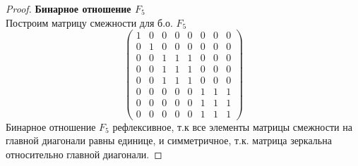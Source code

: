 \pagebreak
\begin{proof} \textbf{Бинарное отношение $F_5$}\\
Построим матрицу смежности для б.о. $F_5$\\
$$ \left( \begin{array}{cccccccc}
          1 &0 &0 &0 &0 &0 &0 &0
        \\0 &1 &0 &0 &0 &0 &0 &0
        \\0 &0 &1 &1 &1 &0 &0 &0
        \\0 &0 &1 &1 &1 &0 &0 &0
        \\0 &0 &1 &1 &1 &0 &0 &0
        \\0 &0 &0 &0 &0 &1 &1 &1
        \\0 &0 &0 &0 &0 &1 &1 &1
        \\0 &0 &0 &0 &0 &1 &1 &1 \end{array} \right) $$
Бинарное отношение $F_5$ рефлексивное, т.к все элементы матрицы смежности на главной диагонали равны единице, и симметричное, т.к. матрица зеркальна относительно главной диагонали.



\end{proof}
